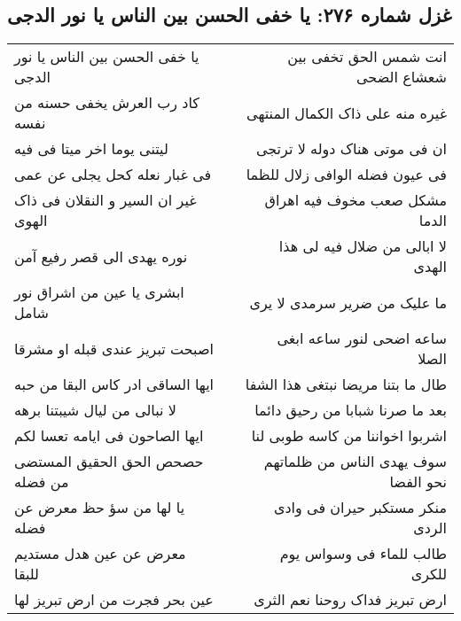 \begin{center}
\section*{غزل شماره ۲۷۶: یا خفی الحسن بین الناس یا نور الدجی}
\label{sec:0276}
\begin{longtable}{l p{0.5cm} r}
یا خفی الحسن بین الناس یا نور الدجی
&&
انت شمس الحق تخفی بین شعشاع الضحی
\\
کاد رب العرش یخفی حسنه من نفسه
&&
غیره منه علی ذاک الکمال المنتهی
\\
لیتنی یوما اخر میتا فی فیه
&&
ان فی موتی هناک دوله لا ترتجی
\\
فی غبار نعله کحل یجلی عن عمی
&&
فی عیون فضله الوافی زلال للظما
\\
غیر ان السیر و النقلان فی ذاک الهوی
&&
مشکل صعب مخوف فیه اهراق الدما
\\
نوره یهدی الی قصر رفیع آمن
&&
لا ابالی من ضلال فیه لی هذا الهدی
\\
ابشری یا عین من اشراق نور شامل
&&
ما علیک من ضریر سرمدی لا یری
\\
اصبحت تبریز عندی قبله او مشرقا
&&
ساعه اضحی لنور ساعه ابغی الصلا
\\
ایها الساقی ادر کاس البقا من حبه
&&
طال ما بتنا مریضا نبتغی هذا الشفا
\\
لا نبالی من لیال شیبتنا برهه
&&
بعد ما صرنا شبابا من رحیق دائما
\\
ایها الصاحون فی ایامه تعسا لکم
&&
اشربوا اخواننا من کاسه طوبی لنا
\\
حصحص الحق الحقیق المستضی من فضله
&&
سوف یهدی الناس من ظلماتهم نحو الفضا
\\
یا لها من سؤ حظ معرض عن فضله
&&
منکر مستکبر حیران فی وادی الردی
\\
معرض عن عین هدل مستدیم للبقا
&&
طالب للماء فی وسواس یوم للکری
\\
عین بحر فجرت من ارض تبریز لها
&&
ارض تبریز فداک روحنا نعم الثری
\\
\end{longtable}
\end{center}
